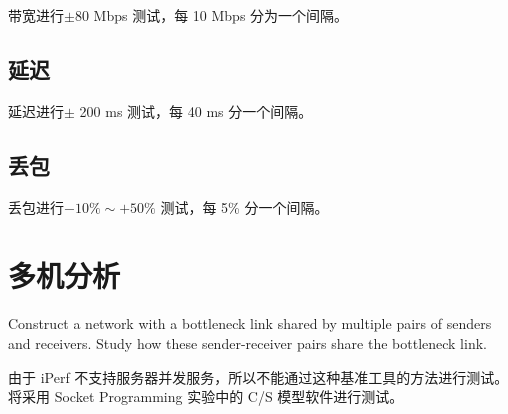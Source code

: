     带宽进行$\pm $80 Mbps 测试，每 10 Mbps 分为一个间隔。


    \subsection{延迟}

    延迟进行$\pm$ 200 ms 测试，每 40 ms 分一个间隔。


    \subsection{丢包}

    丢包进行$-10\%\sim +50\%$ 测试，每 5\% 分一个间隔。


    \section{多机分析}

    Construct a network with a bottleneck link shared by multiple pairs of senders and receivers. Study how these sender-receiver pairs share the bottleneck link.

    由于 iPerf 不支持服务器并发服务，所以不能通过这种基准工具的方法进行测试。将采用 Socket Programming 实验中的 C/S 模型软件进行测试。

